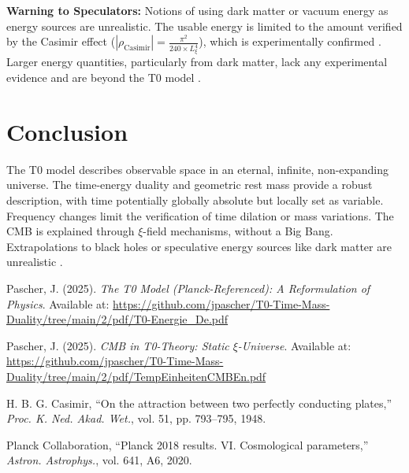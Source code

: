 \documentclass[12pt,a4paper]{article}
\begin{document}
	\textbf{Warning to Speculators:} Notions of using dark matter or vacuum energy as energy sources are unrealistic. The usable energy is limited to the amount verified by the Casimir effect (\( |\rho_{\text{Casimir}}| = \frac{\pi^2}{240 \times L_\xi^4} \)), which is experimentally confirmed \cite{Casimir1948}. Larger energy quantities, particularly from dark matter, lack any experimental evidence and are beyond the T0 model \cite{pascher_t0_energie_2025}.
	
	\section{Conclusion}
	The T0 model describes observable space in an eternal, infinite, non-expanding universe. The time-energy duality and geometric rest mass provide a robust description, with time potentially globally absolute but locally set as variable. Frequency changes limit the verification of time dilation or mass variations. The CMB is explained through \(\xi\)-field mechanisms, without a Big Bang. Extrapolations to black holes or speculative energy sources like dark matter are unrealistic \cite{pascher_t0_energie_2025}.
	
	\begin{thebibliography}{9}
		Pascher, J. (2025). \textit{The T0 Model (Planck-Referenced): A Reformulation of Physics}. Available at: \url{https://github.com/jpascher/T0-Time-Mass-Duality/tree/main/2/pdf/T0-Energie_De.pdf}
		
		Pascher, J. (2025). \textit{CMB in T0-Theory: Static \(\xi\)-Universe}. Available at: \url{https://github.com/jpascher/T0-Time-Mass-Duality/tree/main/2/pdf/TempEinheitenCMBEn.pdf}
		
		H. B. G. Casimir, ``On the attraction between two perfectly conducting plates,'' \emph{Proc. K. Ned. Akad. Wet.}, vol. 51, pp. 793--795, 1948.
		
		Planck Collaboration, ``Planck 2018 results. VI. Cosmological parameters,'' \emph{Astron. Astrophys.}, vol. 641, A6, 2020.
	\end{thebibliography}
	
\end{document}
